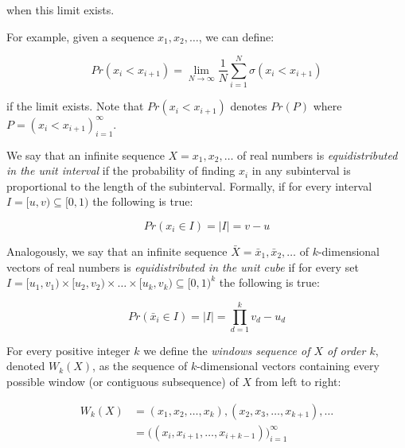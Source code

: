 \documentclass[11pt,a4paper]{tesis}
\theoremstyle{plain}
\theoremstyle{definition}
\begin{document}
when this limit exists.

For example, given a sequence $x_1, x_2, \dots$, we can define:

\begin{equation*}
  Pr(x_i < x_{i+1}) = \lim_{N \to \infty} \frac{1}{N} \sum_{i = 1}^{N} \sigma(x_i < x_{i+1})
\end{equation*}

if the limit exists. Note that $Pr(x_i < x_{i+1})$ denotes $Pr(P)$ where $P = (x_i < x_{i+1})_{i = 1}^{\infty}$.

We say that an infinite sequence $X = x_1, x_2, \dots$ of real numbers is \textit{equidistributed in the unit interval} if the probability of finding $x_i$ in any subinterval is proportional to the length of the subinterval. Formally, if for every interval $I = [u, v) \subseteq [0, 1)$ the following is true:

\begin{equation*}
  Pr(x_i \in I) = |I| = v - u
\end{equation*}


Analogously, we say that an infinite sequence $\bar{X} = \bar{x}_1, \bar{x}_2, \dots$ of $k$-dimensional vectors of real numbers is \textit{equidistributed in the unit cube} if for every set $I = [u_1, v_1) \times [u_2, v_2) \times \dots \times [u_k, v_k) \subseteq [0, 1)^k$ the following is true:

\begin{equation*}
  Pr(\bar{x}_i \in I) = |I| = \prod_{d = 1}^{k} v_d - u_d
\end{equation*}

For every positive integer $k$ we define the \textit{windows sequence of $X$ of order $k$}, denoted $W_k(X)$, as the sequence of $k$-dimensional vectors containing every possible window (or contiguous subsequence) of $X$ from left to right:

\begin{equation}\label{equation:windows-sequence}
  \begin{aligned}
    W_k(X) & = (x_1, x_2, \dots, x_k), (x_2, x_3, \dots, x_{k + 1}), \dots \\
             & = \big( (x_i, x_{i + 1}, \dots, x_{i + k - 1}) \big)_{i = 1}^{\infty}
  \end{aligned}
\end{equation}
\end{document}
